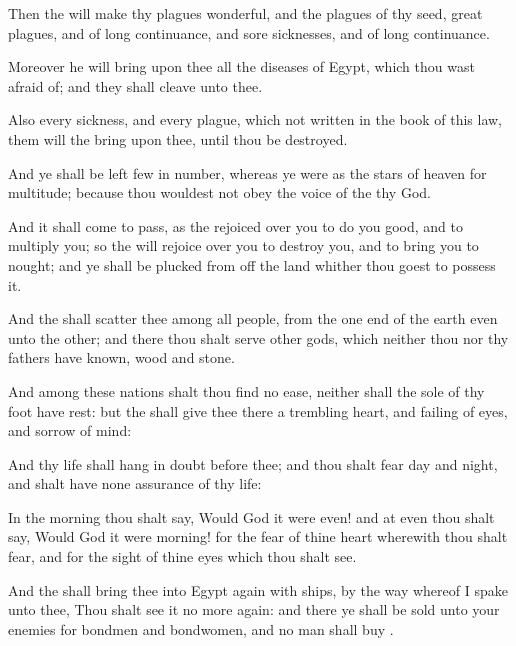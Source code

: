 {Then the
{} will
make thy
plagues
wonderful, and the
plagues of thy
seed,
{}
great
plagues, and of long
continuance, and
sore
sicknesses, and of long
continuance.

Moreover he will
bring upon thee all the
diseases of
Egypt, which thou wast
afraid
of; and they shall
cleave unto thee.

Also every
sickness, and every
plague, which
{} not
written in the
book of this
law, them will the
{}
bring upon thee, until thou be
destroyed.

And ye shall be
left
few in
number,
whereas ye were as the
stars of
heaven for
multitude; because thou wouldest not
obey the
voice of the
{} thy
God.

And it shall come to pass,
{} as the
{}
rejoiced over you to do you
good, and to
multiply you; so the
{} will
rejoice over you to
destroy you, and to bring you to
nought; and ye shall be
plucked from off the
land whither thou
goest to
possess it.

And the
{} shall
scatter thee among all
people, from the one
end of the
earth even unto the
other; and there thou shalt
serve
other
gods, which neither thou nor thy
fathers have
known,
{}
wood and
stone.

And among
these
nations shalt thou find no
ease, neither shall the
sole of thy
foot have
rest: but the
{} shall
give thee there a
trembling
heart, and
failing of
eyes, and
sorrow of
mind:

And thy
life shall
hang in doubt
before thee; and thou shalt
fear
day and
night, and shalt have none
assurance of thy
life:

In the
morning thou shalt
say, Would God it
were
even! and at
even thou shalt
say, Would God it
were
morning! for the
fear of thine
heart wherewith thou shalt
fear, and for the
sight of thine
eyes which thou shalt
see.

And the
{} shall
bring thee into
Egypt
again with
ships, by the
way whereof I
spake unto thee, Thou shalt
see it no more
again: and there ye shall be
sold unto your
enemies for
bondmen and
bondwomen, and no man shall
buy
{}.




\par }
